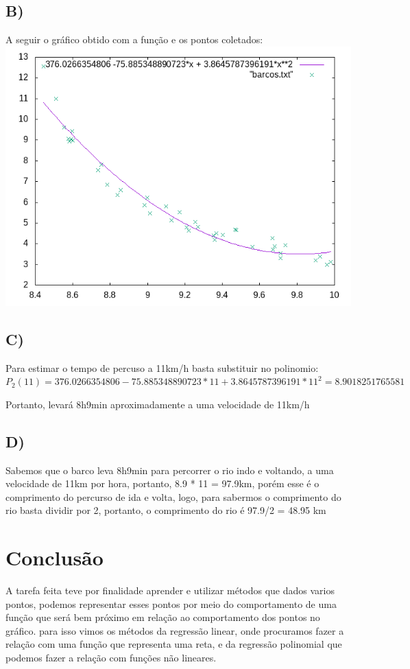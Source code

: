 \documentclass{article}
\begin{document}
    \subsection*{B)}A seguir o gráfico obtido com a função e os pontos coletados:\\
    \includegraphics[scale=0.8]{barcos.png}
    
    \subsection*{C)}\hspace{0.5cm}Para estimar o tempo de percuso a 11km/h basta substituir no polinomio:\\
    $P_2(11) = 376.0266354806 -75.885348890723*11 + 3.8645787396191*11^2 = 8.9018251765581$
    
    Portanto, levará 8h9min aproximadamente a uma velocidade de 11km/h
    
    
    \subsection*{D)}\hspace{0.5cm}Sabemos que o barco leva 8h9min para percorrer o rio indo e voltando, a uma velocidade de 11km por hora, portanto, 8.9 * 11 = 97.9km, porém esse é o comprimento do percurso de ida e volta, logo, para sabermos o comprimento do rio basta dividir por 2, portanto, o comprimento do rio é 97.9/2 = 48.95 km
    
    
\section*{Conclusão}
\hspace{0.5cm}A tarefa feita teve por finalidade aprender e utilizar métodos que dados varios pontos, podemos representar esses pontos por meio do comportamento de uma função que será bem próximo em relação ao comportamento dos pontos no gráfico. para isso vimos os métodos da regressão linear, onde procuramos fazer a relação com uma função que representa uma reta, e da regressão polinomial que podemos fazer a relação com funções não lineares.
\end{document}
